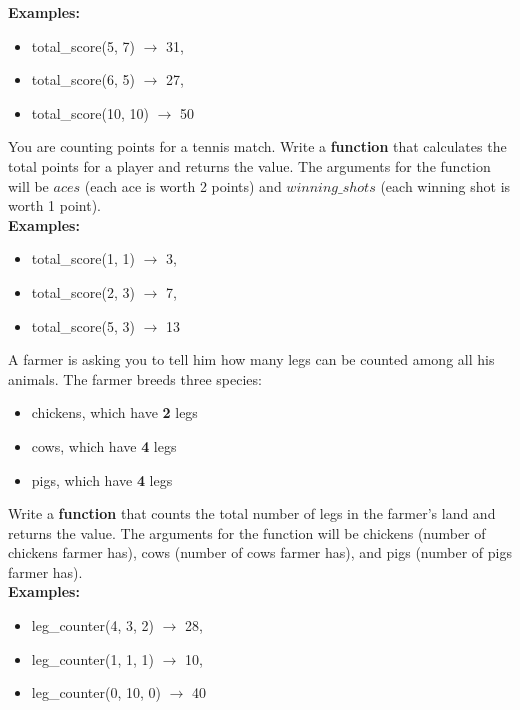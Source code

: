 	\textbf{Examples:}
	\begin{itemize}
		\item total\_score(5, 7) $\rightarrow$ 31, 
		\item total\_score(6, 5) $\rightarrow$ 27, 
		\item total\_score(10, 10) $\rightarrow$ 50 
	\end{itemize}

	\item 
		You are counting points for a tennis match. Write a \textbf{function} that 
		calculates the total points for a player and returns the value. The arguments for the function will be 
		$aces$ (each ace is worth 2 points) and $winning\_shots$ (each winning shot is worth 1 point).\\

	\textbf{Examples:}
	\begin{itemize}
		\item total\_score(1, 1) $\rightarrow$ 3, 
		\item total\_score(2, 3) $\rightarrow$ 7, 
		\item total\_score(5, 3) $\rightarrow$ 13
	\end{itemize}

	\item 
		A farmer is asking you to tell him how many legs can be counted among all his animals. 
		The farmer breeds three species:
		\begin{itemize}
			\item chickens, which have \textbf{2} legs
			\item cows, which have \textbf{4} legs
			\item pigs, which have \textbf{4} legs
		\end{itemize}
		Write a \textbf{function} that counts the total number of legs in the farmer's land and returns the value. 
		The arguments for the function will be chickens (number of chickens farmer has), cows (number of cows farmer has), and pigs (number of pigs farmer has).\\

	\textbf{Examples:}
	\begin{itemize}
		\item  leg\_counter(4, 3, 2) $\rightarrow$ 28, 
		\item  leg\_counter(1, 1, 1) $\rightarrow$ 10, 
		\item  leg\_counter(0, 10, 0) $\rightarrow$ 40 
	\end{itemize}

